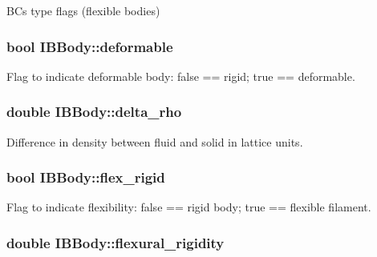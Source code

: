 B\+Cs type flags (flexible bodies) 

\subsubsection[{\texorpdfstring{deformable}{deformable}}]{\setlength{\rightskip}{0pt plus 5cm}bool I\+B\+Body\+::deformable\hspace{0.3cm}{\ttfamily [protected]}}\hypertarget{class_i_b_body_aac0ea66a55dcb0cf41deb2b9a82743e5}{}\label{class_i_b_body_aac0ea66a55dcb0cf41deb2b9a82743e5}


Flag to indicate deformable body\+: false == rigid; true == deformable. 

\subsubsection[{\texorpdfstring{delta\+\_\+rho}{delta_rho}}]{\setlength{\rightskip}{0pt plus 5cm}double I\+B\+Body\+::delta\+\_\+rho\hspace{0.3cm}{\ttfamily [protected]}}\hypertarget{class_i_b_body_a18cd092961f02ecde55363a4d342d098}{}\label{class_i_b_body_a18cd092961f02ecde55363a4d342d098}


Difference in density between fluid and solid in lattice units. 

\subsubsection[{\texorpdfstring{flex\+\_\+rigid}{flex_rigid}}]{\setlength{\rightskip}{0pt plus 5cm}bool I\+B\+Body\+::flex\+\_\+rigid\hspace{0.3cm}{\ttfamily [protected]}}\hypertarget{class_i_b_body_a526f3e83b45b991a79941ee745698ea5}{}\label{class_i_b_body_a526f3e83b45b991a79941ee745698ea5}


Flag to indicate flexibility\+: false == rigid body; true == flexible filament. 

\subsubsection[{\texorpdfstring{flexural\+\_\+rigidity}{flexural_rigidity}}]{\setlength{\rightskip}{0pt plus 5cm}double I\+B\+Body\+::flexural\+\_\+rigidity\hspace{0.3cm}{\ttfamily [protected]}}\hypertarget{class_i_b_body_a4825a8ef9155062ff9d1011479bd4a9e}{}\label{class_i_b_body_a4825a8ef9155062ff9d1011479bd4a9e}


